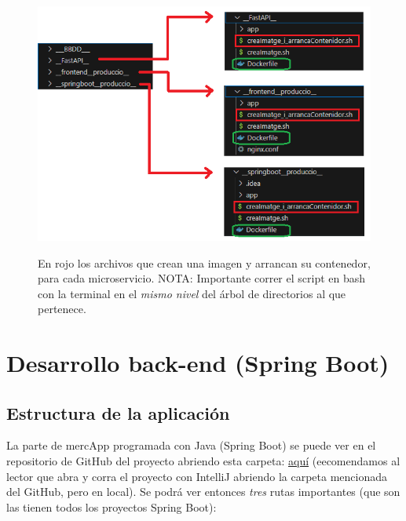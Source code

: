 \documentclass[a4paper,12pt]{report}
\begin{document}
				
				\FloatBarrier
				\setlength{\belowcaptionskip}{3pt}
				\begin{figure}[H]
					\centering
					\caption{En rojo los archivos que crean una imagen y arrancan su contenedor, para cada microservicio. NOTA: Importante correr el script en bash con la terminal en el \textit{mismo nivel} del árbol de directorios al que pertenece.}
					\includegraphics[width=.7\linewidth]{img/dockeritzacioAplicacioPlantilla.png}
					\label{fig:dockeritzacioAplicacioPlantilla}
				\end{figure}
				\FloatBarrier
				
			

			
			\section{Desarrollo back-end (Spring Boot)}
			\label{sec:parteSpringBoot}
			
				\subsection{Estructura de la aplicación}
				\label{sec:estructuraAplicacion}
				
				La parte de mercApp programada con Java (Spring Boot) se puede ver en el repositorio de GitHub del proyecto abriendo esta carpeta: \href{https://github.com/blackcub3s/mercApp/tree/main/APP%20WEB/__springboot__produccio__/app}{aquí} (eecomendamos al lector que abra y corra el proyecto con IntelliJ abriendo la carpeta mencionada del GitHub, pero en local). Se podrá ver entonces \textit{tres} rutas importantes (que son las tienen todos los proyectos Spring Boot):
				
\end{document}

